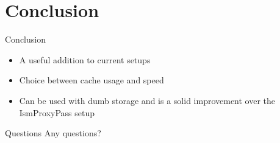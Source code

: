 \documentclass[xcolor=svgnames]{beamer}
\begin{document}
\section{Conclusion}

\begin{frame}{Conclusion}
  \begin{itemize}
      \item A useful addition to current setups
      \item Choice between cache usage and speed
      \item Can be used with dumb storage and is a solid improvement over the
          IsmProxyPass setup
  \end{itemize}
\end{frame}


\begin{frame}{Questions}
    Any questions?


\end{frame}
\end{document}
